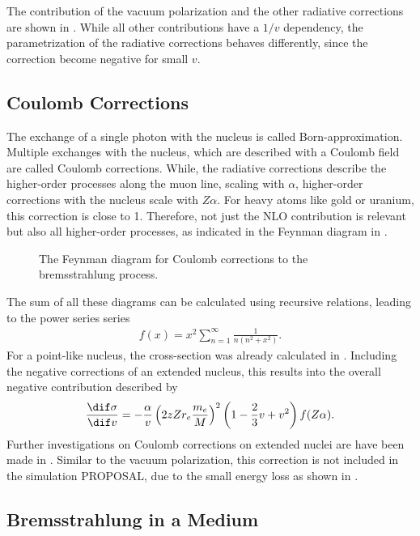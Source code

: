 The contribution of the vacuum polarization and the other radiative corrections are shown in .
While all other contributions have a $1/v$ dependency, the parametrization of the radiative corrections behaves differently, since the correction become negative for small $v$.
 
\subsection{Coulomb Corrections} \label{sec:brems_coulomb}

The exchange of a single photon with the nucleus is called Born-approximation.
Multiple exchanges with the nucleus, which are described with a Coulomb field are called Coulomb corrections.
While, the radiative corrections describe the higher-order processes along the muon line, scaling with $\alpha$, higher-order corrections with the nucleus scale with $Z\alpha$.
For heavy atoms like gold or uranium, this correction is close to 1.
Therefore, not just the NLO contribution is relevant but also all higher-order processes, as indicated in the Feynman diagram in .
\begin{figure}
    \centering
    
    \caption{The Feynman diagram for Coulomb corrections to the bremsstrahlung process.}
    \label{fig:feyn_brems_coulomb}
\end{figure}
The sum of all these diagrams can be calculated using recursive relations, leading to the power series series
\begin{align} \label{eq:coulomb_series}
    f(x) = x^2 \sum_{n=1}^{\infty} \frac{1}{n(n^2 + x^2)} .
\end{align}
For a point-like nucleus, the cross-section was already calculated in \cite{Bethe54I, Davis54II}.
Including the negative corrections of an extended nucleus, this results into the overall negative contribution described by \cite{Andreev97}
\begin{align}
\frac{\dif \sigma}{\dif v} =
    - \frac{\alpha}{v} \left( 2 z Z r_e \frac{m_e}{M} \right)^2
    \left( 1 - \frac23 v + v^2 \right)
    f(Z\alpha) .
\end{align}
Further investigations on Coulomb corrections on extended nuclei are have been made in \cite{Sandrock18Coulomb}.
Similar to the vacuum polarization, this correction is not included in the simulation PROPOSAL, due to the small energy loss as shown in .

\subsection{Bremsstrahlung in a Medium}

